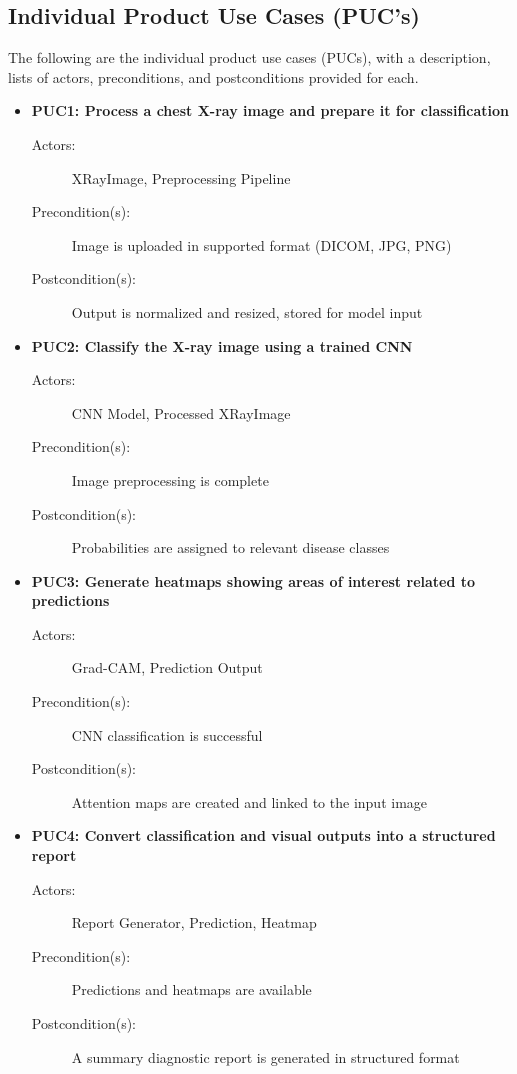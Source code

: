 \documentclass[12pt]{article}
\begin{document}
\subsection{Individual Product Use Cases (PUC's)}
The following are the individual product use cases (PUCs), with a description, lists of actors, preconditions, and postconditions provided for each.

\begin{itemize}
    \item \textbf{PUC1: Process a chest X-ray image and prepare it for classification}
    \begin{description}
        \item[Actors:] XRayImage, Preprocessing Pipeline
        \item[Precondition(s):] Image is uploaded in supported format (DICOM\cite{dicom}, JPG, PNG)
        \item[Postcondition(s):] Output is normalized and resized, stored for model input
    \end{description}

    \item \textbf{PUC2: Classify the X-ray image using a trained CNN}
    \begin{description}
        \item[Actors:] CNN Model, Processed XRayImage
        \item[Precondition(s):] Image preprocessing is complete
        \item[Postcondition(s):] Probabilities are assigned to relevant disease classes
    \end{description}

    \item \textbf{PUC3: Generate heatmaps showing areas of interest related to predictions}
    \begin{description}
        \item[Actors:] Grad-CAM, Prediction Output
        \item[Precondition(s):] CNN classification is successful
        \item[Postcondition(s):] Attention maps are created and linked to the input image
    \end{description}

    \item \textbf{PUC4: Convert classification and visual outputs into a structured report}
    \begin{description}
        \item[Actors:] Report Generator, Prediction, Heatmap
        \item[Precondition(s):] Predictions and heatmaps are available
        \item[Postcondition(s):] A summary diagnostic report is generated in structured format
    \end{description}


\end{itemize}
\end{document}
